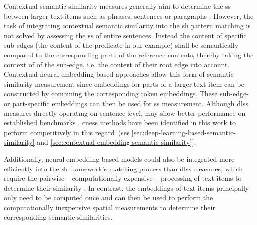 \documentclass[11pt]{scrreprt}
\let\cite\parencite  %
\begin{document}
Contextual semantic similarity measures generally aim to determine the \gls{ss} between larger text items such as phrases, sentences or paragraphs \cite{vermaSemanticSimilarityShort2020, zadSurveyDeepLearning2021}. However, the task of integrating contextual semantic similarity into the \gls{sh} pattern matching is not solved by assessing the \gls{ss} of entire sentences. Instead the content of specific sub-edges (the content of the predicate in our example) shall be semantically compared to the corresponding parts of the reference contents, thereby taking the context of of the sub-edge, i.e. the content of their root edge into account. Contextual neural embedding-based approaches allow this form of semantic similarity measurement since embeddings for parts of a larger text item can be constructed by combining the corresponding token embeddings. These sub-edge- or part-specific embeddings can then be used for \gls{ss} measurement. Although \gls{dlss} measures directly operating on sentence level, may show better performance on established benchmarks \cite{chandrasekaranEvolutionSemanticSimilarity2021}, \gls{cness} methods have been identified in this work to  perform competitively in this regard (see \cref{sec:deep-learning-based-semantic-similarity} and \cref{sec:contextual-embedding-semantic-similarity}).  

Additionally, neural embedding-based models could also be integrated more efficiently into the \gls{sh} framework's matching process than \gls{dlss} measures, which require the pairwise -- computationally expensive --  processing of text items to determine their similarity \cite{reimersSentenceBERTSentenceEmbeddings2019}. In contrast, the embeddings of text items principally only need to be computed once and can then be used to perform the computationally inexpensive spatial measurements to determine their corresponding semantic similarities.

%

\end{document}

